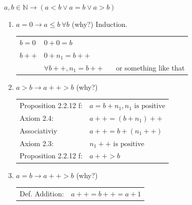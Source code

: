 \documentclass[letterpaper]{article}
\begin{document}
$a,b \in \mathbb{N} \to (a < b \lor a = b \lor a > b)$
\begin{enumerate}
	\item $a = 0 \to a \leq b~ \forall b$ (why?) Induction.
			\begin{center}
				\begin{tabular}{l l}
					$b = 0$ & $0 + 0 = b$ \\
					$b ++ $ & $0 + n_1 = b++$ \\
									& $\forall b++, n_1 = b++$~~~  or something like that
				\end{tabular}
			\end{center}

	\item $a > b \to a++ > b$ (why?)
			\begin{center}
				\begin{tabular}{l l}
					Proposition 2.2.12 f: & $a = b + n_1, n_1 \text{ is positive}$ \\
					Axiom 2.4:            & $a++ = (b + n_1)++$ \\
					Associativiy          & $a++ = b + (n_1++)$ \\
					Axiom 2.3:            & $n_1++ \text{ is positive}$ \\
					Proposition 2.2.12 f: & $a++ > b$
				\end{tabular}
			\end{center}

	\item $a = b \to a++ > b$ (why?)
			\begin{center}
				\begin{tabular}{l l}
					Def. Addition: & $a++ = b++ = a + 1$
				\end{tabular}
			\end{center}
\end{enumerate}
\end{document}

